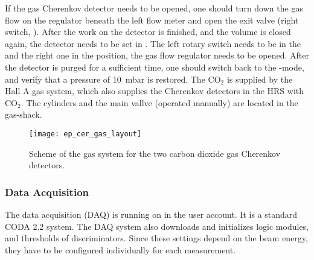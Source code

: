 {{If the gas Cherenkov detector needs to be opened, one should turn down the gas flow
on the regulator beneath the left flow meter and open the exit valve (right switch, ). 
After the work on the detector is finished,
and the volume is closed again, the detector needs to be set in .
The left rotary switch needs to be in the  and the right one in the
 position, the gas flow regulator needs to be opened. After the 
detector is purged for a sufficient time, one should switch back to the -mode,
and verify that a pressure of 10~mbar is restored. The CO$_2$ is supplied by the Hall A 
gas system, which also supplies the Cherenkov detectors in the HRS with CO$_2$. The cylinders
and the main vallve (operated manually) are located in the gas-shack.

\begin{figure}[bht]
    \begin{center}
        \texttt{[image: ep\_cer\_gas\_layout]}
    \end{center}
    \caption[eP: Layout of CO2 Gas System]{
	    Scheme of the gas system for the two carbon dioxide gas Cherenkov detectors.
            }
    \label{fig:ep_cer_gas_layout} 
\end{figure}  

}
\clearpage

\subsubsection{Data Acquisition}
\label{sec:ep_daq}

The data acquisition (DAQ) is running on  in the
 user account. It is a standard CODA 2.2 system.
The DAQ system also downloads and initializes logic modules,
and thresholds of discriminators. Since these settings depend
on the beam energy, they have to be configured individually for 
each measurement.
}
